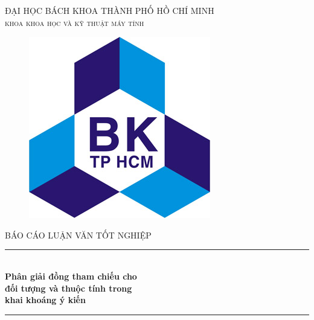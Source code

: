 \documentclass[12pt]{extarticle}
\begin{document}
\usetikzlibrary{arrows,chains,positioning,scopes}


\begin{titlepage}

\newcommand{\HRule}{\rule{\linewidth}{0.5mm}} %

\center %
 
\begin{flushright}
\end{flushright}
\textsc{\large ĐẠI HỌC BÁCH KHOA THÀNH PHỐ HỒ CHÍ MINH}\\[0.2cm]
\textsc{\Large \scshape khoa khoa học và kỹ thuật máy tính}\\[0.5cm]
\begin{figure}[H] 
\centering
\includegraphics[scale=1.6]{images/logo.jpg}
\end{figure} 

\textsc{\large BÁO CÁO LUẬN VĂN TỐT NGHIỆP}\\[0.2cm] %

\HRule \\[0.4cm]
{ \huge \bfseries Phân giải đồng tham chiếu cho \\ đối tượng và thuộc tính trong\\ khai khoáng ý kiến}\\[0.4cm] %
\HRule \\[0.8cm]


\end{titlepage}
\end{document}
